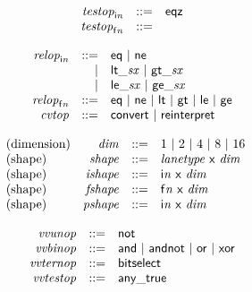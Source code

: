 $$
\begin{array}{@{}lrrl@{}l@{}}
& {{\mathit{testop}}}_{{\mathsf{i}}{{\mathit{n}}}} &::=& \mathsf{eqz} \\
& {{\mathit{testop}}}_{{\mathsf{f}}{{\mathit{n}}}} &::=&  \\
\end{array}
$$

$$
\begin{array}{@{}lrrl@{}l@{}}
& {{\mathit{relop}}}_{{\mathsf{i}}{{\mathit{n}}}} &::=& \mathsf{eq} ~|~ \mathsf{ne} \\ &&|&
{\mathsf{lt\_}}{{\mathit{sx}}} ~|~ {\mathsf{gt\_}}{{\mathit{sx}}} \\ &&|&
{\mathsf{le\_}}{{\mathit{sx}}} ~|~ {\mathsf{ge\_}}{{\mathit{sx}}} \\
& {{\mathit{relop}}}_{{\mathsf{f}}{{\mathit{n}}}} &::=& \mathsf{eq} ~|~ \mathsf{ne} ~|~ \mathsf{lt} ~|~ \mathsf{gt} ~|~ \mathsf{le} ~|~ \mathsf{ge} \\
& {\mathit{cvtop}} &::=& \mathsf{convert} ~|~ \mathsf{reinterpret} \\
\end{array}
$$

\vspace{1ex}

$$
\begin{array}{@{}lrrl@{}l@{}}
\mbox{(dimension)} & {\mathit{dim}} &::=& 1 ~|~ 2 ~|~ 4 ~|~ 8 ~|~ 16 \\
\mbox{(shape)} & {\mathit{shape}} &::=& {\mathit{lanetype}}~\mathsf{x}~{\mathit{dim}} \\
\mbox{(shape)} & {\mathit{ishape}} &::=& {\mathsf{i}}{{\mathit{n}}}~\mathsf{x}~{\mathit{dim}} \\
\mbox{(shape)} & {\mathit{fshape}} &::=& {\mathsf{f}}{{\mathit{n}}}~\mathsf{x}~{\mathit{dim}} \\
\mbox{(shape)} & {\mathit{pshape}} &::=& {\mathsf{i}}{{\mathit{n}}}~\mathsf{x}~{\mathit{dim}} \\
\end{array}
$$

$$
\begin{array}{@{}lrrl@{}l@{}}
& {\mathit{vvunop}} &::=& \mathsf{not} \\
& {\mathit{vvbinop}} &::=& \mathsf{and} ~|~ \mathsf{andnot} ~|~ \mathsf{or} ~|~ \mathsf{xor} \\
& {\mathit{vvternop}} &::=& \mathsf{bitselect} \\
& {\mathit{vvtestop}} &::=& \mathsf{any\_true} \\
\end{array}
$$

